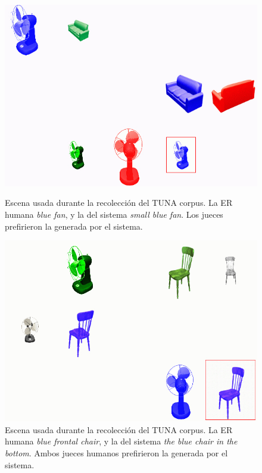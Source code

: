 \begin{figure}[h]
\begin{minipage}{0.48\linewidth}
\centering
\includegraphics[width=\textwidth]{images/smallBlueFan.jpg}
\caption{Escena usada durante la recolecci\'on del TUNA corpus. La ER humana \emph{blue fan}, y la del sistema \emph{small blue fan}. Los jueces prefirieron la generada por el sistema.}
\label{smallBlueFan}
\end{minipage}
\hspace*{.04cm}
\begin{minipage}{0.48\linewidth}
\centering
\vspace*{.4cm}
\includegraphics[width=\textwidth]{images/tuna.jpg} %
\vspace*{-.4cm}
\caption{Escena usada durante la recolecci\'on del TUNA corpus. La ER humana \emph{blue frontal chair}, y la del sistema \emph{the blue chair in the bottom}. Ambos jueces humanos prefirieron la generada por el sistema.}
\label{BlueChair}
\end{minipage}
\end{figure}


